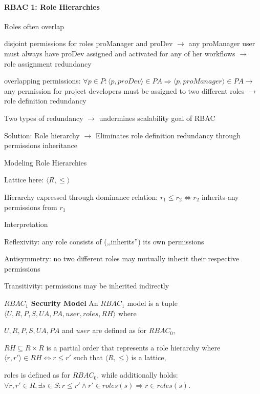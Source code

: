 \documentclass[a4paper]{article}
\renewcommand{\note}[2]{\begin{noteBox} \textbf{#1} #2 \end{noteBox}}
\begin{document}
\begin{multicols}{3}
    \paragraph{RBAC 1: Role Hierarchies}
    Roles often overlap
    \begin{enumerate*}
        \item disjoint permissions for roles proManager and proDev $\rightarrow$ any proManager user must always have proDev assigned and activated for any of her workflows $\rightarrow$ role assignment redundancy
        \item overlapping permissions: $\forall p\in P:\langle p,proDev\rangle \in PA\Rightarrow \langle p,proManager\rangle \in PA\rightarrow$ any permission for project developers must be assigned to two different roles $\rightarrow$ role definition redundancy
        \item Two types of redundancy $\rightarrow$ undermines scalability goal of RBAC
    \end{enumerate*}

    Solution: Role hierarchy $\rightarrow$ Eliminates role definition redundancy through permissions inheritance

    Modeling Role Hierarchies
    \begin{itemize*}
        \item Lattice here: $\langle R,\leq\rangle$
        \item Hierarchy expressed through dominance relation: $r_1\leq r_2 \Leftrightarrow r_2$ inherits any permissions from $r_1$
        \item Interpretation
        \begin{itemize*}
            \item Reflexivity: any role consists of (,,inherits'') its own permissions
            \item Antisymmetry: no two different roles may mutually inherit their respective permissions
            \item Transitivity: permissions may be inherited indirectly
        \end{itemize*}
    \end{itemize*}

    \note{$RBAC_1$ Security Model}{An $RBAC_1$ model is a tuple $\langle U,R,P,S,UA,PA,user,roles,RH\rangle$ where
        \begin{itemize*}
            \item $U,R,P,S,UA,PA$ and $user$ are defined as for $RBAC_0$,
            \item $RH\subseteq R\times R$ is a partial order that represents a role hierarchy where $\langle r,r'\rangle \in RH\Leftrightarrow r\leq r'$ such that $\langle R,\leq\rangle$ is a lattice,
            \item roles is defined as for $RBAC_0$, while additionally holds: $\forall r,r'\in R,\exists s\in S:r\leq r'\wedge r'\in roles(s)\Rightarrow r\in roles(s)$.
        \end{itemize*}
    }


\end{multicols}
\end{document}

